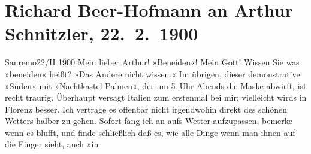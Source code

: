 

         
         \renewcommand{\erwaehntePersonen}{Personen: Christian Wilhelm Allers, Richard Beer-Hofmann, Paula Beer-Hofmann, Mirjam Beer-Hofmann, Georg Brandes, Berta Doepler, Georg Hirschfeld, Robert Hirschfeld, Hugo von Hofmannsthal, Oskar Mayer, Max Messer, Elly Petersen, Gustav Schwarzkopf}
         \renewcommand{\erwaehnteOrte}{Orte: Bad Ischl, Florenz, Italien, Sanremo, Wien}
         \renewcommand{\erwaehnteWerke}{Werke: Der Tod Georgs, Kabale und Liebe, Wiener Bummelgeschichten}
               \section[Richard Beer-Hofmann an Arthur Schnitzler, 22. 2. 1900]{ Richard Beer-Hofmann an Arthur Schnitzler, 22. 2. 1900}\nopagebreak{}\rehead{ }\begin{ledgroupsized}[t]{13cm}\normalsize\beginnumbering{} \toendnotes[C]{\smallbreak\pagebreak[2]} 
\toendnotes[C]{\smallbreak}\pstart
           \raggedleft{}{\pb}Sanremo22/II 1900\pend
           \pstart
           Mein lieber Arthur! »Beneiden«! Mein Gott! Wissen Sie was »beneiden«
               heißt? »Das Andere nicht wissen.« Im übrigen, dieser demonstrative »Süden« mit
               »Nachtkastel-Palmen«, der um 5 Uhr Abends die Maske abwirft, ist recht traurig.
               Überhaupt versagt Italien zum erstenmal bei
               mir; vielleicht wirds in Florenz besser. Ich
               vertrage es offenbar nicht irgendwohin direkt des schönen Wetters halber zu gehen.
               Sofort fang ich an aufs Wetter aufzupassen, bemerke wenn es blufft, und finde
               schließlich daß es, wie alle Dinge wenn man ihnen auf die Finger sieht, auch »in

\end{ledgroupsized}
